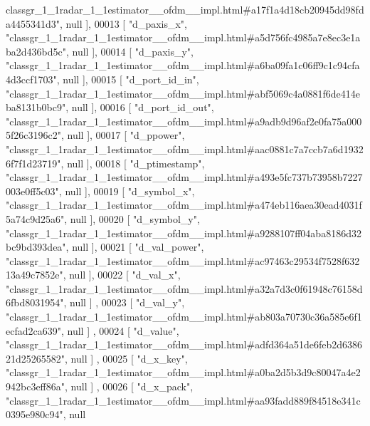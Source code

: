 \begin{DoxyCode}
{      classgr\_1\_1radar\_1\_1estimator\_\_ofdm\_\_impl.html#a17f1a4d18cb20945dd98fda4455341d3"}, null ],
00013     [ \textcolor{stringliteral}{"d\_paxis\_x"}, \textcolor{stringliteral}{"classgr\_1\_1radar\_1\_1estimator\_\_ofdm\_\_impl.html#a5d756fc4985a7e8ec3e1aba2d436bd5c"}, null
       ],
00014     [ \textcolor{stringliteral}{"d\_paxis\_y"}, \textcolor{stringliteral}{"classgr\_1\_1radar\_1\_1estimator\_\_ofdm\_\_impl.html#a6ba09fa1c06ff9c1c94cfa4d3ccf1703"}, null
       ],
00015     [ \textcolor{stringliteral}{"d\_port\_id\_in"}, \textcolor{stringliteral}{"classgr\_1\_1radar\_1\_1estimator\_\_ofdm\_\_impl.html#abf5069c4a0881f6de414eba8131b0bc9"}, 
      null ],
00016     [ \textcolor{stringliteral}{"d\_port\_id\_out"}, \textcolor{stringliteral}{"classgr\_1\_1radar\_1\_1estimator\_\_ofdm\_\_impl.html#a9adb9d96af2e0fa75a0005f26c3196c2"}, 
      null ],
00017     [ \textcolor{stringliteral}{"d\_ppower"}, \textcolor{stringliteral}{"classgr\_1\_1radar\_1\_1estimator\_\_ofdm\_\_impl.html#aac0881c7a7ccb7a6d19326f7f1d23719"}, null 
      ],
00018     [ \textcolor{stringliteral}{"d\_ptimestamp"}, \textcolor{stringliteral}{"classgr\_1\_1radar\_1\_1estimator\_\_ofdm\_\_impl.html#a493e5fc737b73958b7227003e0ff5c03"}, 
      null ],
00019     [ \textcolor{stringliteral}{"d\_symbol\_x"}, \textcolor{stringliteral}{"classgr\_1\_1radar\_1\_1estimator\_\_ofdm\_\_impl.html#a474eb116aea30ead4031f5a74c9d25a6"}, 
      null ],
00020     [ \textcolor{stringliteral}{"d\_symbol\_y"}, \textcolor{stringliteral}{"classgr\_1\_1radar\_1\_1estimator\_\_ofdm\_\_impl.html#a9288107ff04aba8186d32bc9bd393dea"}, 
      null ],
00021     [ \textcolor{stringliteral}{"d\_val\_power"}, \textcolor{stringliteral}{"classgr\_1\_1radar\_1\_1estimator\_\_ofdm\_\_impl.html#ac97463c29534f7528f63213a49c7852e"}, 
      null ],
00022     [ \textcolor{stringliteral}{"d\_val\_x"}, \textcolor{stringliteral}{"classgr\_1\_1radar\_1\_1estimator\_\_ofdm\_\_impl.html#a32a7d3c0f61948c76158d6fbd8031954"}, null ]
      ,
00023     [ \textcolor{stringliteral}{"d\_val\_y"}, \textcolor{stringliteral}{"classgr\_1\_1radar\_1\_1estimator\_\_ofdm\_\_impl.html#ab803a70730c36a585e6f1ecfad2ca639"}, null ]
      ,
00024     [ \textcolor{stringliteral}{"d\_value"}, \textcolor{stringliteral}{"classgr\_1\_1radar\_1\_1estimator\_\_ofdm\_\_impl.html#adfd364a51de6feb2d638621d25265582"}, null ]
      ,
00025     [ \textcolor{stringliteral}{"d\_x\_key"}, \textcolor{stringliteral}{"classgr\_1\_1radar\_1\_1estimator\_\_ofdm\_\_impl.html#a0ba2d5b3d9c80047a4e2942bc3eff86a"}, null ]
      ,
00026     [ \textcolor{stringliteral}{"d\_x\_pack"}, \textcolor{stringliteral}{"classgr\_1\_1radar\_1\_1estimator\_\_ofdm\_\_impl.html#aa93fadd889f84518e341c0395e980c94"}, null 

\end{DoxyCode}
